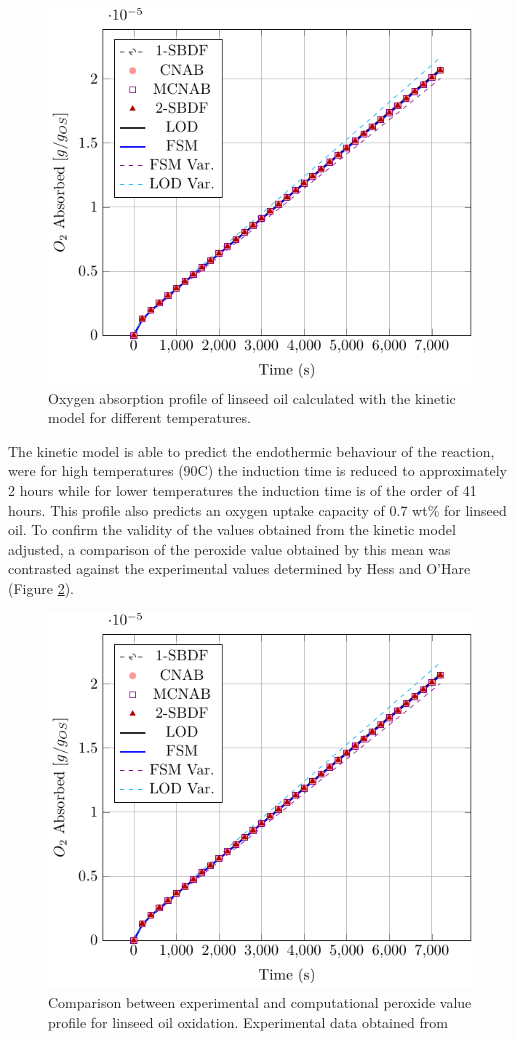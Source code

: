 \begin{refsection}
\begin{figure}[ht]
    \centering
    \includegraphics[width=0.56\linewidth,page=5]{Documento_Latex/Imagenes/rozogafas.pdf}
    \caption{Oxygen absorption profile of linseed oil calculated with the kinetic model for different temperatures.}
    \label{fig:temperature_kinetics_result}
\end{figure}

The kinetic model is able to predict the endothermic behaviour of the reaction, were for high temperatures (90\degree C) the induction time is reduced to approximately 2 hours while for lower temperatures the induction time is of the order of 41 hours. This profile also predicts an  oxygen uptake capacity of 0.7 wt\% for linseed oil. To confirm the validity of the values obtained from  the kinetic model adjusted, a comparison of the peroxide value obtained by this mean was contrasted against the experimental values determined by Hess and O'Hare \cite{Hess1950OxidationOil} (Figure \ref{fig:Peroxide value}).

\begin{figure}[H]
    \centering
    \includegraphics[width=0.7\linewidth,page=6]{Documento_Latex/Imagenes/rozogafas.pdf}
    \caption{Comparison between experimental and computational peroxide value profile for linseed oil oxidation. Experimental data obtained from \cite{Hess1950OxidationOil}}
    \label{fig:Peroxide value}
\end{figure}


\end{refsection}
